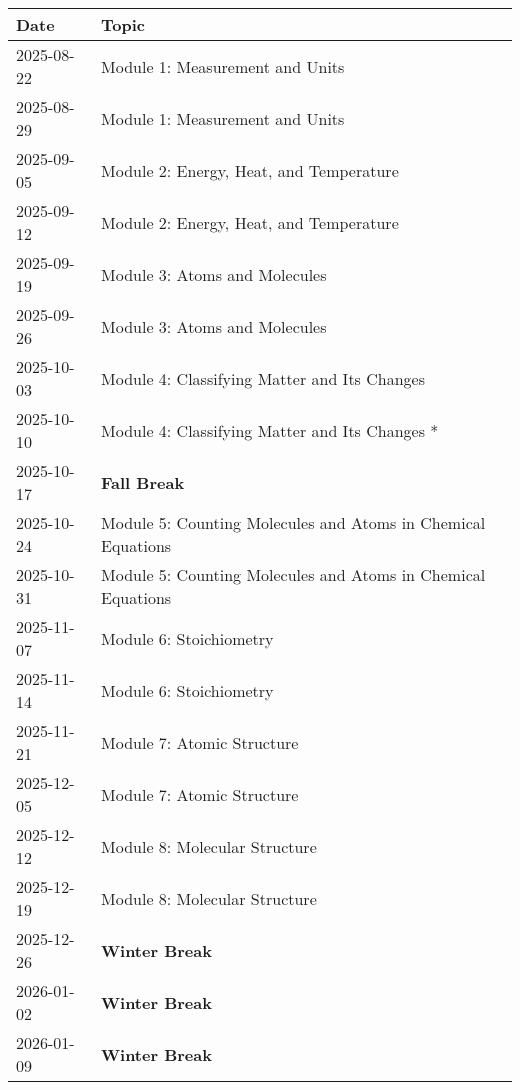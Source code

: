 \documentclass[11pt, oneside]{article}   	%
\begin{document}
\begin{table}[h]
\centering
\begin{tabular}{ l | l }
Date & Topic \\
\hline
2025-08-22 & Module 1:  Measurement and Units \\
2025-08-29 & Module 1:  Measurement and Units \\
2025-09-05 & Module 2: Energy, Heat, and Temperature \\
2025-09-12 & Module 2: Energy, Heat, and Temperature \\
2025-09-19 & Module 3: Atoms and Molecules \\
2025-09-26 & Module 3: Atoms and Molecules \\
2025-10-03 & Module 4: Classifying Matter and Its Changes \\
2025-10-10 & Module 4: Classifying Matter and Its Changes * \\

2025-10-17 & \textbf{Fall Break} \\

2025-10-24 & Module 5: Counting Molecules and Atoms in Chemical Equations \\
2025-10-31 & Module 5: Counting Molecules and Atoms in Chemical Equations \\
2025-11-07 & Module 6: Stoichiometry \\
2025-11-14 & Module 6: Stoichiometry \\
2025-11-21 & Module 7: Atomic Structure \\
2025-12-05 & Module 7: Atomic Structure \\
2025-12-12 & Module 8: Molecular Structure \\
2025-12-19 & Module 8: Molecular Structure \\

2025-12-26  & \textbf{Winter Break} \\
2026-01-02  & \textbf{Winter Break} \\
2026-01-09  & \textbf{Winter Break} \\


\end{tabular}
\end{table}
\end{document}

